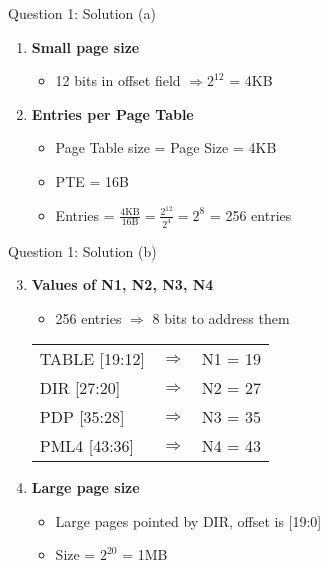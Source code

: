 \documentclass[aspectratio=169,12pt]{beamer}
\begin{document}
\begin{frame}{Question 1: Solution (a)}
\begin{enumerate}
    \item \textbf{Small page size}
    \begin{itemize}
        \item[] 12 bits in offset field $\Rightarrow 2^{12}$ = 4KB
    \end{itemize}
    \item \textbf{Entries per Page Table}
    \begin{itemize}
        \item Page Table size = Page Size = 4KB
        \item PTE = 16B
        \item Entries = $\frac{\text{4KB}}{\text{16B}} = \frac{2^{12}}{2^4} = 2^8$ = 256 entries
    \end{itemize}
\end{enumerate}
\end{frame}

\begin{frame}{Question 1: Solution (b)}
\begin{enumerate}
    \setcounter{enumi}{2}
    \item \textbf{Values of N1, N2, N3, N4}
    \begin{itemize}
        \item 256 entries $\Rightarrow$ 8 bits to address them
    \end{itemize}
    \begin{center}
        \begin{tabular}{lcl}
            TABLE [19:12] & $\Rightarrow$ & N1 = 19\\
            DIR [27:20]   & $\Rightarrow$ & N2 = 27\\
            PDP [35:28]   & $\Rightarrow$ & N3 = 35\\
            PML4 [43:36]  & $\Rightarrow$ & N4 = 43
        \end{tabular}
    \end{center}

    \item \textbf{Large page size}
    \begin{itemize}
        \item Large pages pointed by DIR, offset is [19:0]
        \item Size = $2^{20}$ = 1MB
    \end{itemize}
\end{enumerate}
\end{frame}
\end{document}
